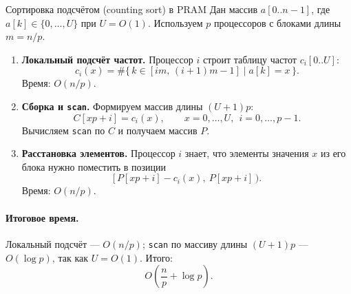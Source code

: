 \begin{Example}{Сортировка подсчётом (counting sort) в PRAM}{}
	Дан массив $a[0..n-1]$, где $a[k] \in \{0, \dots, U\}$ при $U = O(1)$. Используем $p$ процессоров с блоками длины $m = n/p$.
	
	\begin{enumerate}
		\item \textbf{Локальный подсчёт частот.} Процессор $i$ строит таблицу частот $c_i[0..U]$:
		\[
		c_i(x) = \#\{\, k \in [im,\, (i+1)m - 1] \mid a[k] = x \,\}.
		\]
		Время: $O(n/p)$.
		
		\item \textbf{Сборка и \texttt{scan}.} Формируем массив длины $(U+1)p$:
		\[
		C[xp + i] = c_i(x), \qquad x = 0, \dots, U,\ \ i = 0, \dots, p-1.
		\]
		Вычисляем \texttt{scan} по $C$ и получаем массив $P$.
		
		\item \textbf{Расстановка элементов.} Процессор $i$ знает, что элементы значения $x$ из его блока нужно поместить в позиции
		\[
		\bigl[\, P[xp + i] - c_i(x),\ P[xp + i] \,\bigr).
		\]
		Время: $O(n/p)$.
	\end{enumerate}
	
	\paragraph{Итоговое время.}
	Локальный подсчёт — $O(n/p)$; \texttt{scan} по массиву длины $(U+1)p$ — $O(\log p)$, так как $U = O(1)$. Итого:
	\[
	O\!\left(\frac{n}{p} + \log p\right).
	\]
\end{Example}